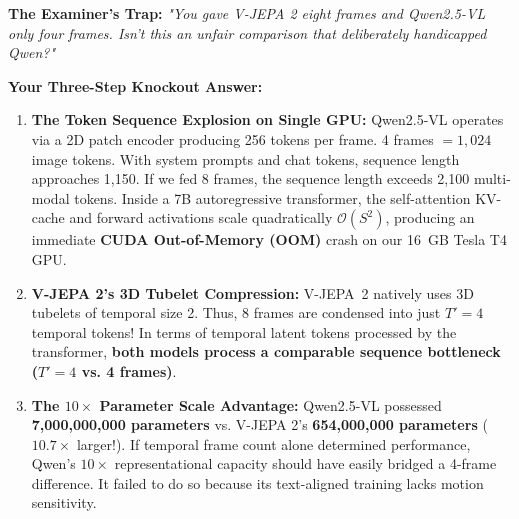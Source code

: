 \documentclass[a4paper, 11pt]{article}
\begin{document}
\begin{trapbox}
\textbf{The Examiner's Trap:} \textit{"You gave V-JEPA 2 eight frames and Qwen2.5-VL only four frames. Isn't this an unfair comparison that deliberately handicapped Qwen?"}

\textbf{Your Three-Step Knockout Answer:}
\begin{enumerate}
    \item \textbf{The Token Sequence Explosion on Single GPU:} Qwen2.5-VL operates via a 2D patch encoder producing 256 tokens per frame. 4 frames $= 1,024$ image tokens. With system prompts and chat tokens, sequence length approaches 1,150. If we fed 8 frames, the sequence length exceeds 2,100 multi-modal tokens. Inside a 7B autoregressive transformer, the self-attention KV-cache and forward activations scale quadratically $\mathcal{O}(S^2)$, producing an immediate \textbf{CUDA Out-of-Memory (OOM)} crash on our 16~GB Tesla T4 GPU.
    \item \textbf{V-JEPA 2's 3D Tubelet Compression:} V-JEPA~2 natively uses 3D tubelets of temporal size 2. Thus, 8 frames are condensed into just $T'=4$ temporal tokens! In terms of temporal latent tokens processed by the transformer, \textbf{both models process a comparable sequence bottleneck ($T'=4$ vs. 4 frames)}.
    \item \textbf{The $10\times$ Parameter Scale Advantage:} Qwen2.5-VL possessed \textbf{7,000,000,000 parameters} vs. V-JEPA 2's \textbf{654,000,000 parameters} ($10.7\times$ larger!). If temporal frame count alone determined performance, Qwen's $10\times$ representational capacity should have easily bridged a 4-frame difference. It failed to do so because its text-aligned training lacks motion sensitivity.
\end{enumerate}
\end{trapbox}
\end{document}

